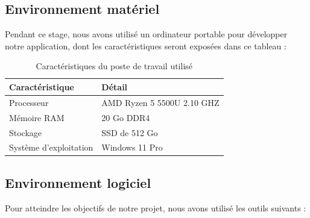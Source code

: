 \subsection{Environnement matériel}
Pendant ce stage, nous avons utilisé un ordinateur portable pour développer notre application, dont les caractéristiques seront exposées dans ce tableau : 

\begin{table}[H]
\centering
\begin{tabular}{|l|l|}
\hline
\textbf{Caractéristique}        & \textbf{Détail}                         \\ \hline
Processeur                      & AMD Ryzen 5 5500U 2.10 GHZ                    \\ \hline
Mémoire RAM                    & 20 Go DDR4                  \\ \hline
Stockage                        & SSD de 512 Go                           \\ \hline

Système d’exploitation          & Windows 11 Pro                         \\ \hline
\end{tabular}
\captionsetup{justification=centering}
\caption{Caractéristiques du poste de travail utilisé}
\label{tab:environnement matériel}
\end{table}


\subsection{Environnement logiciel}
Pour atteindre les objectifs de notre projet, nous avons utilisé les outils suivants :

